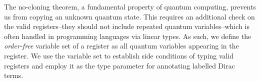 The no-cloning theorem, a fundamental property of quantum computing, prevents us from copying an unknown quantum state. This requires an additional check on the valid registers--they should not include repeated quantum variables--which is often handled in programming languages via linear types. As such, we define the \emph{order-free} variable set of a register as all quantum variables appearing in the register.
We use the variable set to establish side conditions of typing valid registers and employ it as the type parameter for annotating labelled Dirac terms.



